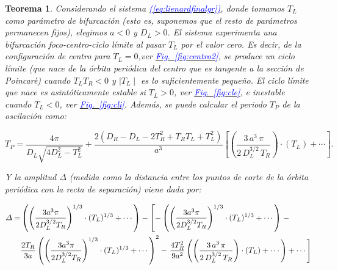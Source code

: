 \documentclass[12pt,a4paper]{report} %
\newtheorem{theorem}{Teorema}[chapter]
\newcommand{\fref}[1]{\hyperref[#1]{\textcolor{blue}{Fig.~\ref*{#1}}}}
\newcommand{\eref}[1]{\hyperref[#1]{\textcolor{blue}{(\ref*{#1})}}}
\newcommand{\fref}[1]{\hyperref[#1]{\textcolor{blue}{\textit{Fig.~\ref*{#1}}}}}
\newcommand{\eref}[1]{\hyperref[#1]{\textcolor{blue}{\textit{(\ref*{#1})}}}}
\begin{document}
	\begin{theorem}
		\label{teo:5.1}
		Considerando el sistema \eref{eq:lienardfinalgr}, donde tomamos $T_L$ como parámetro de bifurcación (esto es, suponemos que el resto de parámetros permanecen fijos), elegimos $a<0$ y $D_L>0$. El sistema experimenta una bifurcación foco-centro-ciclo límite al pasar $T_L$ por el valor cero. Es decir, de la configuración de centro para $T_L=0$,ver \fref{fig:centro2}, se produce un ciclo límite (que nace de la órbita periódica del centro que es tangente a la sección de Poincarè) cuando $T_L T_R<0$ y $\mid T_L \mid$ es lo suficientemente pequeño. El ciclo límite que nace es asintóticamente estable si $T_L>0$, ver \fref{fig:cle}, e inestable cuando $T_L<0$, ver \fref{fig:cli}. Además, se puede calcular el periodo $T_P$ de la oscilación como:
		
		\begin{equation}
			\label{eq:tperiodo}
			T_P= \frac{4\pi}{D_L\sqrt{4D_L^2-T_L^2}}+\frac{2(D_R-D_L-2T_R^2+T_RT_L+T_L^2)}{a^3}\left[\left( \frac{3\, a^3 \, \pi}{2\, D_L^{3/2}\, T_R} \right)\cdot \left(T_L\right)+\cdots\right].
		\end{equation}\smallskip
		
		\noindent Y la amplitud $\varDelta$ (medida como la distancia entre los puntos de corte de la órbita periódica con la recta de separación) viene dada por:
		
		\begin{equation}
			\label{eq:amplitu}
			\scalebox{0.95}{$\displaystyle
				\begin{split}
					\varDelta = &\left( \left( \frac{3a^3 \pi}{2D_L^{3/2}T_R} \right)^{1/3} \cdot (T_L)^{1/3} + \cdots \right) - \left[ -\left( \left( \frac{3a^3 \pi}{2D_L^{3/2}T_R} \right)^{1/3} \cdot (T_L)^{1/3} + \cdots \right) \right.-\\
					&\frac{2T_R}{3a} \left( \left( \frac{3a^3 \pi}{2D_L^{3/2}T_R} \right)^{1/3} \cdot (T_L)^{1/3} + \cdots \right)^2 - \left. \frac{4T_R^2}{9a^2} \left( \left( \frac{3\, a^3 \, \pi}{2\, D_L^{3/2}\, T_R} \right)\cdot \left(T_L\right)+\cdots \right) + \cdots \right]
				\end{split}
				$}
		\end{equation}
	\end{theorem}
	
	\newpage
	
\end{document}
